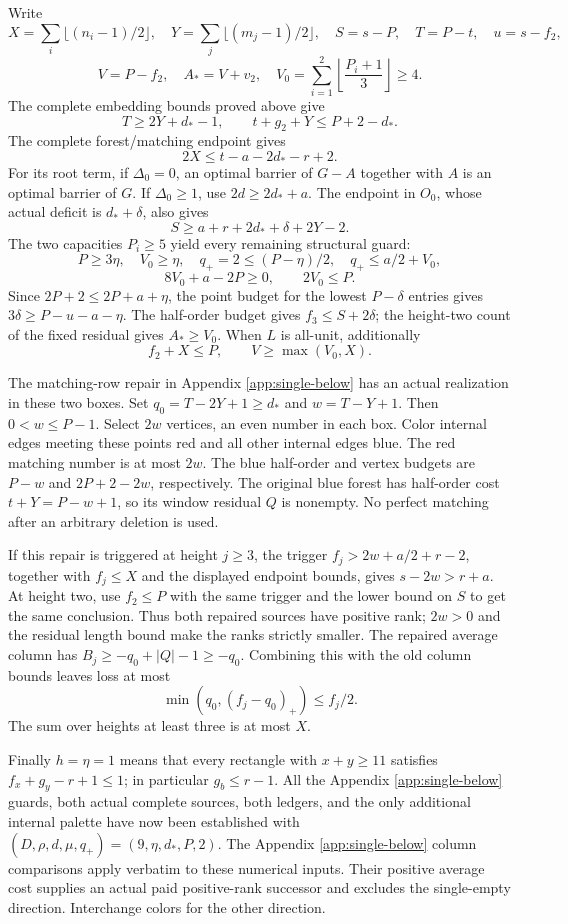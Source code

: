 \documentclass[11pt,a4paper]{article}
\theoremstyle{definition}
\begin{document}
Write
\[
X=\sum_i\lfloor(n_i-1)/2\rfloor,\quad
Y=\sum_j\lfloor(m_j-1)/2\rfloor,\quad
S=s-P,\quad T=P-t,\quad u=s-f_2,
\]
\[
V=P-f_2,\quad A_*=V+v_2,\quad
V_0=\sum_{i=1}^2\left\lfloor\frac{P_i+1}{3}\right\rfloor\ge4.
\]
The complete embedding bounds proved above give
\[
T\ge2Y+d_*-1,\qquad t+g_2+Y\le P+2-d_*.
\]
The complete forest/matching endpoint gives
\[
2X\le t-a-2d_*-r+2.
\]
For its root term, if \(\Delta_0=0\), an optimal barrier of \(G-A\) together with \(A\) is an optimal barrier of \(G\). If \(\Delta_0\ge1\), use \(2d\ge2d_*+a\). The endpoint in \(O_0\), whose actual deficit is \(d_*+\delta\), also gives
\[
S\ge a+r+2d_*+\delta+2Y-2.
\]
The two capacities \(P_i\ge5\) yield every remaining structural guard:
\[
P\ge3\eta,\quad V_0\ge\eta,\quad
q_+=2\le(P-\eta)/2,\quad q_+\le a/2+V_0,
\]
\[
8V_0+a-2P\ge0,\qquad 2V_0\le P.
\]
Since \(2P+2\le2P+a+\eta\), the point budget for the lowest \(P-\delta\) entries gives
\(3\delta\ge P-u-a-\eta\).
The half-order budget gives \(f_3\le S+2\delta\); the height-two count of the fixed residual gives \(A_*\ge V_0\).
When \(L\) is all-unit, additionally
\[
f_2+X\le P,\qquad V\ge\max(V_0,X).
\]

The matching-row repair in Appendix \ref{app:single-below} has an actual realization in these two boxes.
Set \(q_0=T-2Y+1\ge d_*\) and \(w=T-Y+1\).
Then \(0<w\le P-1\). Select \(2w\) vertices, an even number in each box. Color internal edges meeting these points red and all other internal edges blue.
The red matching number is at most \(2w\). The blue half-order and vertex budgets are \(P-w\) and \(2P+2-2w\), respectively.
The original blue forest has half-order cost
\(t+Y=P-w+1\), so its window residual \(Q\) is nonempty.
No perfect matching after an arbitrary deletion is used.

If this repair is triggered at height \(j\ge3\), the trigger
\(f_j>2w+a/2+r-2\), together with \(f_j\le X\) and the displayed endpoint bounds, gives \(s-2w>r+a\).
At height two, use \(f_2\le P\) with the same trigger and the lower bound on \(S\) to get the same conclusion.
Thus both repaired sources have positive rank; \(2w>0\) and the residual length bound make the ranks strictly smaller.
The repaired average column has \(B_j\ge-q_0+|Q|-1\ge-q_0\).
Combining this with the old column bounds leaves loss at most
\[
\min(q_0,(f_j-q_0)_+)\le f_j/2.
\]
The sum over heights at least three is at most \(X\).

Finally \(h=\eta=1\) means that every rectangle with \(x+y\ge11\) satisfies
\(f_x+g_y-r+1\le1\); in particular \(g_b\le r-1\).
All the Appendix \ref{app:single-below} guards, both actual complete sources, both ledgers, and the only additional internal palette have now been established with
\((D,\rho,d,\mu,q_+)=(9,\eta,d_*,P,2)\).
The Appendix \ref{app:single-below} column comparisons apply verbatim to these numerical inputs. Their positive average cost supplies an actual paid positive-rank successor and excludes the single-empty direction. Interchange colors for the other direction.
\end{document}
